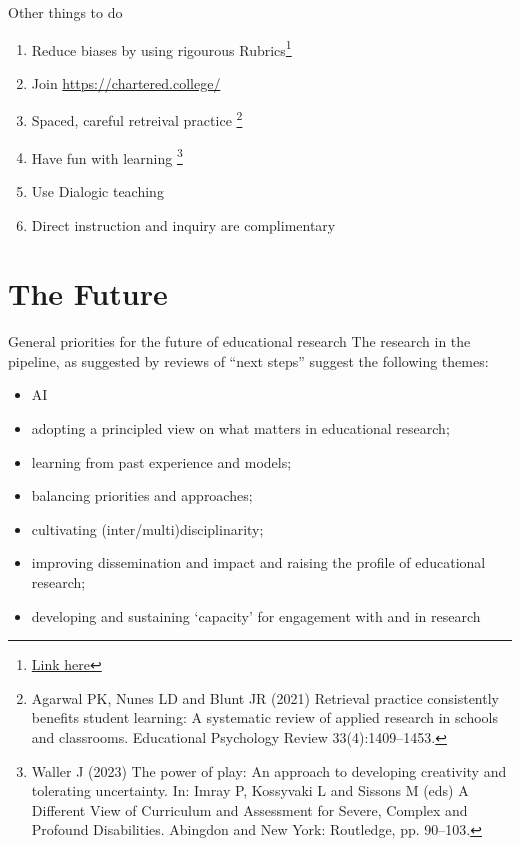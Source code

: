 \documentclass{beamer}					%
\begin{document}
\begin{frame}{Other things to do}
\begin{enumerate}
    \item Reduce biases by using rigourous Rubrics\footnote{\href{https://www.educationnext.org/wp-content/uploads/2022/01/ednext_XXI_1_quinn.pdf}{Link here}}
    \item Join \href{https://chartered.college/}{https://chartered.college/}
    \item Spaced, careful retreival practice \footnote{Agarwal PK, Nunes LD and Blunt JR (2021) Retrieval practice consistently benefits student learning: A systematic review of applied research in schools and classrooms. Educational Psychology Review 33(4):1409–1453.}
    \item Have fun with learning \footnote{Waller J (2023) The power of play: An approach to developing creativity and tolerating uncertainty. In: Imray P, Kossyvaki L and Sissons M (eds) A Different View of Curriculum and Assessment for Severe, Complex and Profound Disabilities. Abingdon and New York: Routledge, pp. 90–103.}
    \item Use Dialogic teaching
    \item Direct instruction and inquiry are complimentary
\end{enumerate}
\end{frame}
\section{The Future}
\begin{frame}{General priorities for the future of educational research}
The research in the pipeline, as suggested by reviews of ``next steps'' suggest the following themes: 
\begin{itemize}
\item AI
\item adopting a principled view on what matters in educational research; 
\item learning from past experience and models; 
\item balancing priorities and approaches; 
\item cultivating (inter/multi)disciplinarity; 
\item improving dissemination and impact and raising the profile of educational research;
\item developing and sustaining ‘capacity’ for engagement with and in 
research
\end{itemize}
\end{frame}
\end{document}
